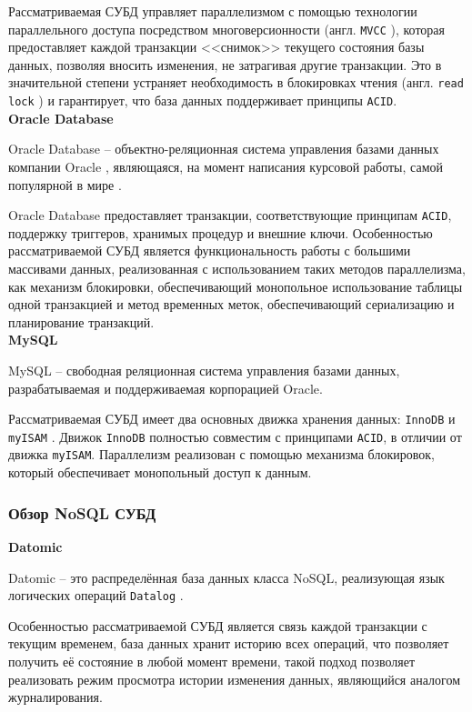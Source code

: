 Рассматриваемая СУБД управляет параллелизмом с помощью технологии параллельного доступа посредством многоверсионности (англ. \texttt{MVCC} \cite{mvcc}), которая предоставляет каждой транзакции <<снимок>> текущего состояния базы данных, позволяя вносить изменения, не затрагивая другие транзакции. Это в значительной степени устраняет необходимость в блокировках чтения (англ. \texttt{read lock} \cite{r-lock}) и гарантирует, что база данных поддерживает принципы \texttt{ACID}.\\

\noindent\textbf{Oracle Database}

Oracle Database \cite{oracle} -- объектно-реляционная система управления базами данных компании Oracle \cite{oracle-company}, являющаяся, на момент написания курсовой работы, самой популярной в мире \cite{oracle-popular}.

Oracle Database предоставляет транзакции, соответствующие принципам \texttt{ACID}, поддержку триггеров, хранимых процедур и внешние ключи. Особенностью рассматриваемой СУБД является функциональность работы с большими массивами данных, реализованная с использованием таких методов параллелизма, как механизм блокировки, обеспечивающий монопольное использование таблицы одной транзакцией и метод временных меток, обеспечивающий сериализацию и планирование транзакций.\\

\noindent\textbf{MySQL}

MySQL \cite{mysql} -- свободная реляционная система управления базами данных, разрабатываемая и поддерживаемая корпорацией Oracle.

Рассматриваемая СУБД имеет два основных движка хранения данных: \texttt{InnoDB} \cite{innodb} и \texttt{myISAM} \cite{myisam}. Движок \texttt{InnoDB} полностью совместим с принципами \texttt{ACID}, в отличии от движка \texttt{myISAM}. Параллелизм реализован с помощью механизма блокировок, который обеспечивает монопольный доступ к данным.

\subsubsection{Обзор NoSQL СУБД}

\noindent\textbf{Datomic}

Datomic \cite{datomic} -- это распределённая база данных класса NoSQL, реализующая язык логических операций \texttt{Datalog} \cite{datalog}.

Особенностью рассматриваемой СУБД является связь каждой транзакции с текущим временем, база данных хранит историю всех операций, что позволяет получить её состояние в любой момент времени, такой подход позволяет реализовать режим просмотра истории изменения данных, являющийся аналогом журналирования.

